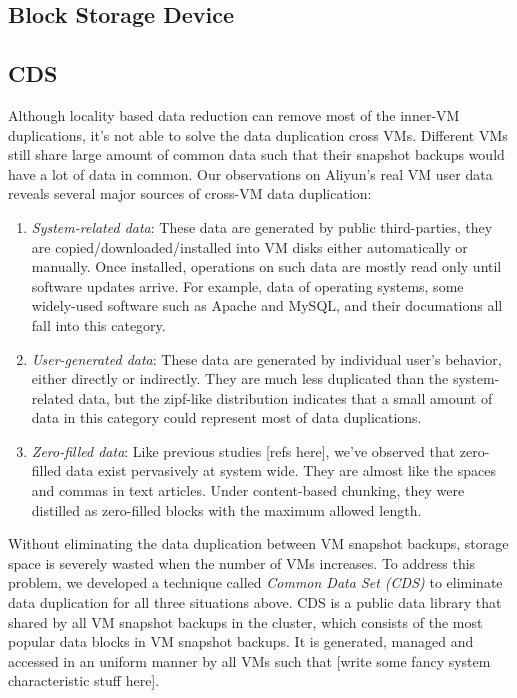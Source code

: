 \subsection{Block Storage Device}
\subsection{CDS}
Although locality based data reduction can remove most of the inner-VM duplications,
it's not able to solve the data duplication cross VMs. Different VMs still share large amount
of common data such that their snapshot backups would have a lot of data in common.
Our observations on Aliyun's real VM user data reveals several major sources of cross-VM data duplication:
  \begin{enumerate}
  \item \emph{System-related data}: These data are generated by public third-parties, they are copied/downloaded/installed into VM disks either automatically or manually. Once installed, operations on such data are mostly read only until software updates arrive. For example, data of operating systems, some widely-used software such as Apache and MySQL, and their documations all fall into this category.
  \item \emph{User-generated data}: These data are generated by individual user's behavior, either directly or indirectly. They are much less duplicated than the system-related data, but the zipf-like distribution indicates that a small amount of data in this category could represent most of data duplications.
  \item \emph{Zero-filled data}: Like previous studies [refs here], we've observed that zero-filled data exist pervasively at system wide. They are almost like the spaces and commas in text articles. Under content-based chunking, they were distilled as zero-filled blocks with the maximum allowed length. 
  \end{enumerate}

Without eliminating the data duplication between VM snapshot backups, storage space is severely wasted when the number of VMs increases.
To address this problem, we developed a technique called \emph{Common Data Set (CDS)} to eliminate data duplication for all three situations above. 
CDS is a public data library that shared by all VM snapshot backups in the cluster, 
which consists of the most popular data blocks in VM snapshot backups. It is generated, 
managed and accessed in an uniform manner by all VMs such that [write some fancy system characteristic stuff here].

